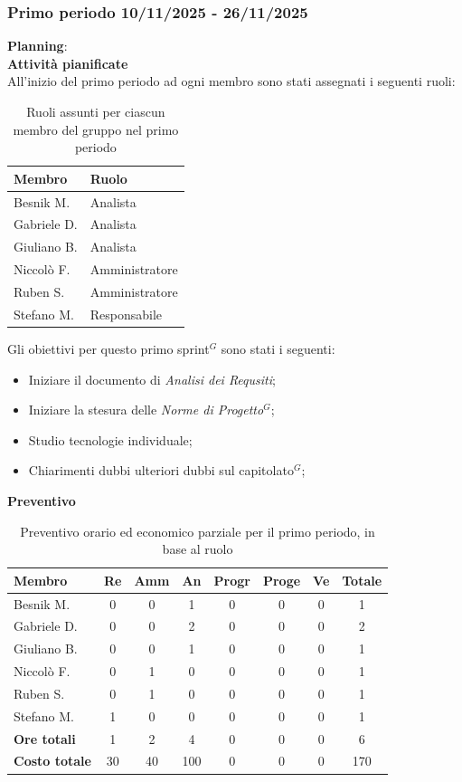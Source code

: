 \documentclass[a4paper,10pt]{article}
\begin{document}
\newpage

\subsubsection{Primo periodo 10/11/2025 - 26/11/2025}
\textbf{Planning}: \\
\textbf{Attività pianificate} \\ All'inizio del primo periodo ad ogni membro sono stati assegnati i seguenti ruoli: 
\begin{table}[H]
\centering
\begin{tabular}{|l|l|}
\hline
\textbf{Membro} & \textbf{Ruolo} \\
\hline
Besnik M.  & Analista \\
\hline
Gabriele D.  & Analista \\
\hline
Giuliano B. & Analista \\
\hline
Niccolò F. & Amministratore \\
\hline
Ruben S. & Amministratore \\
\hline
Stefano M.  & Responsabile\\
\hline
\end{tabular}
\caption{Ruoli assunti per ciascun membro del gruppo nel primo periodo}
\end{table}

Gli obiettivi per questo primo sprint$^G$ sono stati i seguenti:
\begin{itemize}
  \item Iniziare il documento di \textit{Analisi dei Requsiti};
  \item Iniziare la stesura delle \textit{Norme di Progetto$^G$};
  \item Studio tecnologie individuale;
  \item Chiarimenti dubbi ulteriori dubbi sul capitolato$^G$;
\end{itemize}


\textbf{Preventivo} \\
\begin{table}[H]
\centering
\begin{tabular}{|l|c|c|c|c|c|c|c|}
\hline
\textbf{Membro} & \textbf{Re} & \textbf{Amm} & \textbf{An} & \textbf{Progr} & \textbf{Proge} & \textbf{Ve} & \textbf{Totale} \\
\hline
Besnik M.  & 0 & 0 & 1 & 0 & 0 & 0 & 1 \\
Gabriele D. & 0 & 0 & 2 & 0 & 0 & 0 & 2 \\
Giuliano B. & 0 & 0 & 1 & 0 & 0 & 0 & 1 \\
Niccolò F.  & 0 & 1 & 0 & 0 & 0 & 0 & 1 \\
Ruben S. & 0 & 1 & 0 & 0 & 0 & 0 & 1 \\
Stefano M. & 1 & 0 & 0 & 0 & 0 & 0 & 1 \\
\hline
\textbf{Ore totali} & 1 & 2 & 4 & 0 & 0 & 0 & 6 \\
\hline
\textbf{Costo totale} & 30 & 40 & 100 & 0 & 0 & 0 & 170 \\
\hline
\end{tabular}
\caption{Preventivo orario ed economico parziale per il primo periodo, in base al ruolo}
\end{table}
\end{document}
